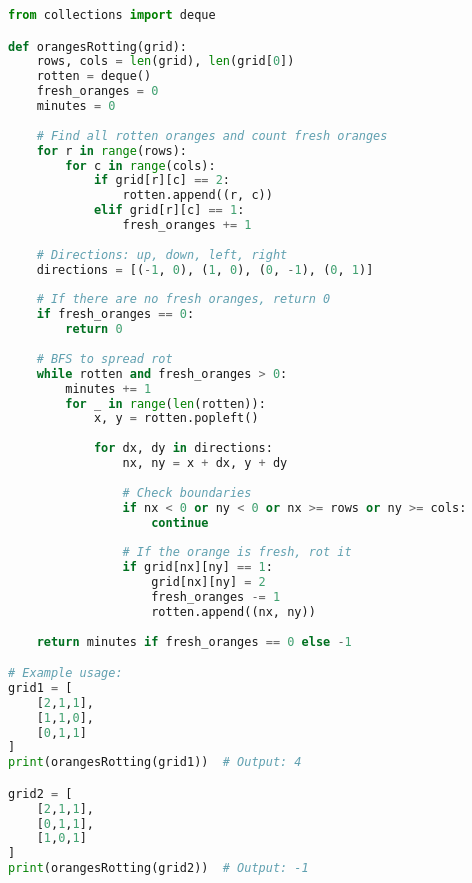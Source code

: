 \begin{fullwidth}
\begin{lstlisting}[language=Python]
from collections import deque

def orangesRotting(grid):
    rows, cols = len(grid), len(grid[0])
    rotten = deque()
    fresh_oranges = 0
    minutes = 0
    
    # Find all rotten oranges and count fresh oranges
    for r in range(rows):
        for c in range(cols):
            if grid[r][c] == 2:
                rotten.append((r, c))
            elif grid[r][c] == 1:
                fresh_oranges += 1
    
    # Directions: up, down, left, right
    directions = [(-1, 0), (1, 0), (0, -1), (0, 1)]
    
    # If there are no fresh oranges, return 0
    if fresh_oranges == 0:
        return 0
    
    # BFS to spread rot
    while rotten and fresh_oranges > 0:
        minutes += 1
        for _ in range(len(rotten)):
            x, y = rotten.popleft()
            
            for dx, dy in directions:
                nx, ny = x + dx, y + dy
                
                # Check boundaries
                if nx < 0 or ny < 0 or nx >= rows or ny >= cols:
                    continue
                
                # If the orange is fresh, rot it
                if grid[nx][ny] == 1:
                    grid[nx][ny] = 2
                    fresh_oranges -= 1
                    rotten.append((nx, ny))
    
    return minutes if fresh_oranges == 0 else -1

# Example usage:
grid1 = [
    [2,1,1],
    [1,1,0],
    [0,1,1]
]
print(orangesRotting(grid1))  # Output: 4

grid2 = [
    [2,1,1],
    [0,1,1],
    [1,0,1]
]
print(orangesRotting(grid2))  # Output: -1
\end{lstlisting}
\end{fullwidth}

